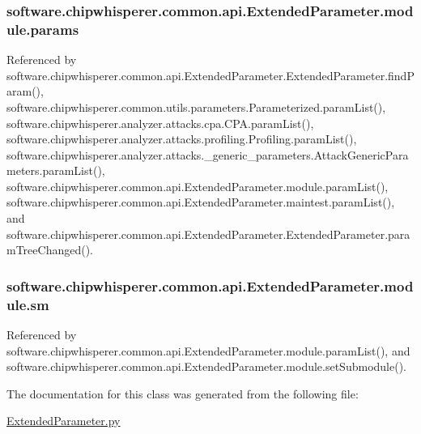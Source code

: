 \subsubsection[{params}]{\setlength{\rightskip}{0pt plus 5cm}software.\+chipwhisperer.\+common.\+api.\+Extended\+Parameter.\+module.\+params}\label{classsoftware_1_1chipwhisperer_1_1common_1_1api_1_1ExtendedParameter_1_1module_a196c0852bd3e2daef38f573b77622a2f}


Referenced by software.\+chipwhisperer.\+common.\+api.\+Extended\+Parameter.\+Extended\+Parameter.\+find\+Param(), software.\+chipwhisperer.\+common.\+utils.\+parameters.\+Parameterized.\+param\+List(), software.\+chipwhisperer.\+analyzer.\+attacks.\+cpa.\+C\+P\+A.\+param\+List(), software.\+chipwhisperer.\+analyzer.\+attacks.\+profiling.\+Profiling.\+param\+List(), software.\+chipwhisperer.\+analyzer.\+attacks.\+\_\+generic\+\_\+parameters.\+Attack\+Generic\+Parameters.\+param\+List(), software.\+chipwhisperer.\+common.\+api.\+Extended\+Parameter.\+module.\+param\+List(), software.\+chipwhisperer.\+common.\+api.\+Extended\+Parameter.\+maintest.\+param\+List(), and software.\+chipwhisperer.\+common.\+api.\+Extended\+Parameter.\+Extended\+Parameter.\+param\+Tree\+Changed().

\hypertarget{classsoftware_1_1chipwhisperer_1_1common_1_1api_1_1ExtendedParameter_1_1module_ae8580335d1d31a863cb6992c26518746}{}
\subsubsection[{sm}]{\setlength{\rightskip}{0pt plus 5cm}software.\+chipwhisperer.\+common.\+api.\+Extended\+Parameter.\+module.\+sm}\label{classsoftware_1_1chipwhisperer_1_1common_1_1api_1_1ExtendedParameter_1_1module_ae8580335d1d31a863cb6992c26518746}


Referenced by software.\+chipwhisperer.\+common.\+api.\+Extended\+Parameter.\+module.\+param\+List(), and software.\+chipwhisperer.\+common.\+api.\+Extended\+Parameter.\+module.\+set\+Submodule().



The documentation for this class was generated from the following file\+:\begin{DoxyCompactItemize}
\item 
\hyperlink{ExtendedParameter_8py}{Extended\+Parameter.\+py}\end{DoxyCompactItemize}
